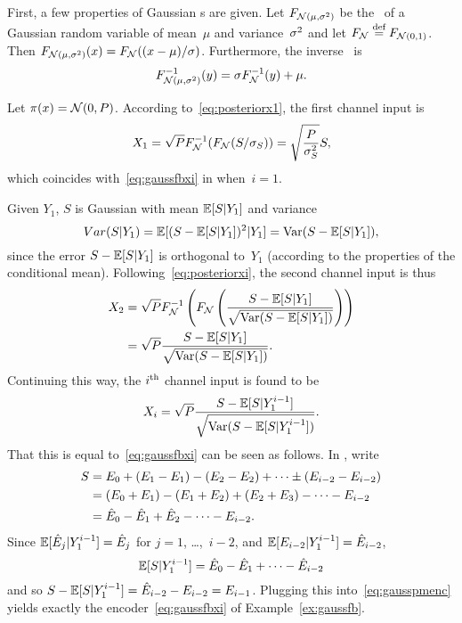 \begin{example}
  \label{ex:gaussfbpost}
  First, a few properties of Gaussian \cdf s are given. Let $F_{{\mathcal{N}}(\mu, {\sigma^2})}$
  be the \cdf\ of a Gaussian random variable of mean~$\mu$ and variance~${\sigma^2}$
  and let $F_{\mathcal{N}} \stackrel{\text{def}}{=} F_{{\mathcal{N}}(0,1)}$. Then $F_{{\mathcal{N}}(\mu,{\sigma^2})}(x) =
  F_{\mathcal{N}}((x-\mu)/\sigma)$. Furthermore, the inverse \cdf\ is 
  \begin{equation*}
    F_{{\mathcal{N}}(\mu,{\sigma^2})}^{-1}(y) = \sigma F_{\mathcal{N}}^{-1}(y) + \mu.
  \end{equation*}

  Let $\pi(x) = {\mathcal{N}}(0,P)$. According to~\eqref{eq:posteriorx1}, the first channel
  input is
  \begin{equation*}
    X_1 = \sqrt{P} F_{{\mathcal{N}}}^{-1}(F_{{\mathcal{N}}}(S/\sigma_S)) = \sqrt{\frac{P}{{\sigma_S^2}}} S,
  \end{equation*}
  which coincides with~\eqref{eq:gaussfbxi} in  when~$i=1$.

  Given $Y_1$, $S$ is Gaussian with mean $\mathbb{E}[S|Y_1]$ and variance
  \[ Var(S|Y_1) = \mathbb{E}[(S-\mathbb{E}[S|Y_1])^2 | Y_1] = \operatorname{Var}(S-\mathbb{E}[S|Y_1]), \]
  since the error $S - \mathbb{E}[S|Y_1]$ is orthogonal to~$Y_1$ (according to the
  properties of the conditional mean).  Following~\eqref{eq:posteriorxi}, the
  second channel input is thus
  \begin{align*}
    X_2 &= \sqrt P F_{{\mathcal{N}}}^{-1} \left( F_{{\mathcal{N}}} \left( \frac{S - \mathbb{E}[S|Y_1]}
    {\sqrt{\operatorname{Var}(S-\mathbb{E}[S|Y_1])}} \right) \right) \\
    &= \sqrt{P} \frac{S - \mathbb{E}[S|Y_1]}{\sqrt{\operatorname{Var}(S-\mathbb{E}[S|Y_1])}}.
  \end{align*}
  Continuing this way, the $i{^{\text{th}}}$ channel input is found to be
  \begin{equation}
    \label{eq:gausspmenc}
    X_i = \sqrt{P} \frac{S - \mathbb{E}[S|Y_1^{i-1}]}{\sqrt{\operatorname{Var}(S-\mathbb{E}[S|Y_1^{i-1}])}}.
  \end{equation}
  That this is equal to~\eqref{eq:gaussfbxi} can be seen as follows. In
  , write
  \begin{align*}
    S &= E_0 + (E_1 - E_1) - (E_2 - E_2) + \dots \pm (E_{i-2} -
    E_{i-2}) \\
    &= (E_0 + E_1) - (E_1 + E_2) + (E_2 + E_3) - \dots - E_{i-2} \\
    &= \hat{E}_0 - \hat{E}_1 + \hat{E}_2 - \dots - E_{i-2}.
  \end{align*}
  Since $\mathbb{E}[\hat{E}_j | Y_1^{i-1}] = \hat{E}_j$ for $j = 1$, \dots,~$i-2$, and
  $\mathbb{E}[E_{i-2}|Y_1^{i-1}] = \hat{E}_{i-2}$, 
  \begin{equation*}
    \mathbb{E}[S|Y_1^{i-1}] = \hat{E}_0 - \hat{E}_1 + \dots  - \hat{E}_{i-2}
  \end{equation*}
  and so $S - \mathbb{E}[S|Y_1^{i-1}] = \hat{E}_{i-2} - E_{i-2} = E_{i-1}$. Plugging this
  into~\eqref{eq:gausspmenc} yields exactly the encoder~\eqref{eq:gaussfbxi} of
  Example~\ref{ex:gaussfb}.
\end{example}

